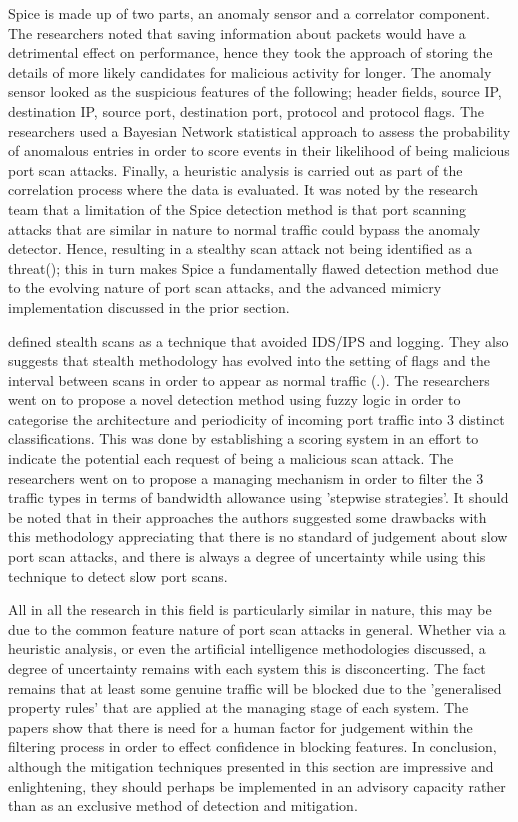 Spice is made up of two parts, an anomaly sensor and a correlator component. The researchers noted that saving information about packets would have a detrimental effect on performance, hence they took the approach of storing the details of more likely candidates for malicious activity for longer. The anomaly sensor looked as the suspicious features of the following; header fields, source IP, destination IP, source port, destination port, protocol and protocol flags. The researchers used a Bayesian Network statistical approach to assess the probability of anomalous entries in order to score events in their likelihood of being malicious port scan attacks. Finally, a heuristic analysis is carried out as part of the correlation process where the data is evaluated. It was noted by the research team that a limitation of the Spice detection method is that port scanning attacks that are similar in nature to normal traffic could bypass the anomaly detector. Hence, resulting in a stealthy scan attack not being identified as a threat(\cite{staniford2002practical}); this in turn makes Spice a fundamentally flawed detection method due to the evolving nature of port scan attacks, and the advanced mimicry implementation discussed in the prior section.

\citeauthor{kim2008slow} defined stealth scans as a technique that avoided IDS/IPS and logging. They also suggests that stealth methodology has evolved into the setting of flags and the interval between scans in order to appear as normal traffic (.\cite{kim2008slow}). The researchers went on to propose a novel detection method using fuzzy logic in order to categorise the architecture and periodicity of incoming port traffic into 3 distinct classifications. This was done by establishing a scoring system in an effort to indicate the potential each request of being a malicious scan attack. The researchers went on to propose a managing mechanism in order to filter the 3 traffic types in terms of bandwidth allowance using 'stepwise strategies'. It should be noted that in their approaches the authors suggested some drawbacks with this methodology appreciating that there is no standard of judgement about slow port scan attacks, and there is always a degree of uncertainty while using this technique to detect slow port scans.

All in all the research in this field is particularly similar in nature, this may be due to the common feature nature of port scan attacks in general. Whether via a heuristic analysis, or even the artificial intelligence methodologies discussed, a degree of uncertainty remains with each system this is disconcerting. The fact remains that at least some genuine traffic will be blocked due to the 'generalised property rules' that are applied at the managing stage of each system. The papers show that there is need for a human factor for judgement within the filtering process in order to effect confidence in blocking features. In conclusion, although the mitigation techniques presented in this section are impressive and enlightening, they should perhaps be implemented in an advisory capacity rather than as an exclusive method of detection and mitigation.
